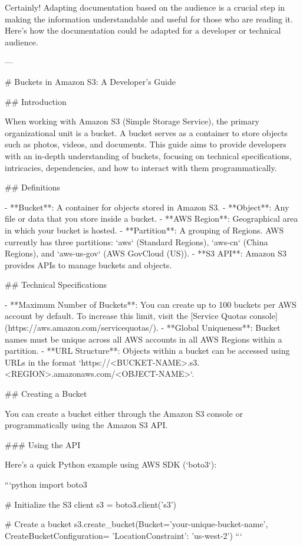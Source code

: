 Certainly! Adapting documentation based on the audience is a crucial step in making the information understandable and useful for those who are reading it. Here's how the documentation could be adapted for a developer or technical audience.

---

# Buckets in Amazon S3: A Developer's Guide

## Introduction

When working with Amazon S3 (Simple Storage Service), the primary organizational unit is a bucket. A bucket serves as a container to store objects such as photos, videos, and documents. This guide aims to provide developers with an in-depth understanding of buckets, focusing on technical specifications, intricacies, dependencies, and how to interact with them programmatically.

## Definitions

- **Bucket**: A container for objects stored in Amazon S3.
- **Object**: Any file or data that you store inside a bucket.
- **AWS Region**: Geographical area in which your bucket is hosted.
- **Partition**: A grouping of Regions. AWS currently has three partitions: `aws` (Standard Regions), `aws-cn` (China Regions), and `aws-us-gov` (AWS GovCloud (US)).
- **S3 API**: Amazon S3 provides APIs to manage buckets and objects.

## Technical Specifications

- **Maximum Number of Buckets**: You can create up to 100 buckets per AWS account by default. To increase this limit, visit the [Service Quotas console](https://aws.amazon.com/servicequotas/).
- **Global Uniqueness**: Bucket names must be unique across all AWS accounts in all AWS Regions within a partition.
- **URL Structure**: Objects within a bucket can be accessed using URLs in the format `https://<BUCKET-NAME>.s3.<REGION>.amazonaws.com/<OBJECT-NAME>`.

## Creating a Bucket

You can create a bucket either through the Amazon S3 console or programmatically using the Amazon S3 API.

### Using the API

Here's a quick Python example using AWS SDK (`boto3`):

```python
import boto3

# Initialize the S3 client
s3 = boto3.client('s3')

# Create a bucket
s3.create_bucket(Bucket='your-unique-bucket-name', CreateBucketConfiguration={
    'LocationConstraint': 'us-west-2'})
```

